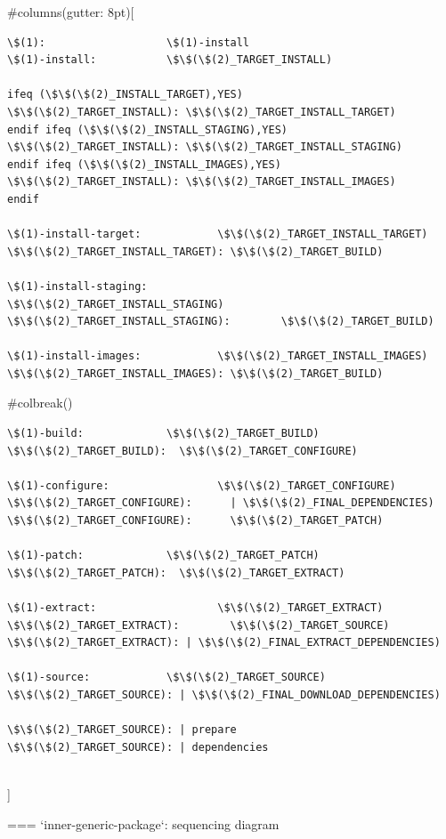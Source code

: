   
#columns(gutter: 8pt)[
\begin{block}{}
\begin{verbatim}
\$(1):                   \$(1)-install
\$(1)-install:           \$\$(\$(2)_TARGET_INSTALL)

ifeq (\$\$(\$(2)_INSTALL_TARGET),YES)
\$\$(\$(2)_TARGET_INSTALL): \$\$(\$(2)_TARGET_INSTALL_TARGET)
endif ifeq (\$\$(\$(2)_INSTALL_STAGING),YES)
\$\$(\$(2)_TARGET_INSTALL): \$\$(\$(2)_TARGET_INSTALL_STAGING)
endif ifeq (\$\$(\$(2)_INSTALL_IMAGES),YES)
\$\$(\$(2)_TARGET_INSTALL): \$\$(\$(2)_TARGET_INSTALL_IMAGES)
endif

\$(1)-install-target:            \$\$(\$(2)_TARGET_INSTALL_TARGET)
\$\$(\$(2)_TARGET_INSTALL_TARGET): \$\$(\$(2)_TARGET_BUILD)

\$(1)-install-staging:                   \$\$(\$(2)_TARGET_INSTALL_STAGING)
\$\$(\$(2)_TARGET_INSTALL_STAGING):        \$\$(\$(2)_TARGET_BUILD)

\$(1)-install-images:            \$\$(\$(2)_TARGET_INSTALL_IMAGES)
\$\$(\$(2)_TARGET_INSTALL_IMAGES): \$\$(\$(2)_TARGET_BUILD)
\end{verbatim}
\end{block}
     #colbreak()
\begin{block}{}
\begin{verbatim}
\$(1)-build:             \$\$(\$(2)_TARGET_BUILD)
\$\$(\$(2)_TARGET_BUILD):  \$\$(\$(2)_TARGET_CONFIGURE)

\$(1)-configure:                 \$\$(\$(2)_TARGET_CONFIGURE)
\$\$(\$(2)_TARGET_CONFIGURE):      | \$\$(\$(2)_FINAL_DEPENDENCIES)
\$\$(\$(2)_TARGET_CONFIGURE):      \$\$(\$(2)_TARGET_PATCH)

\$(1)-patch:             \$\$(\$(2)_TARGET_PATCH)
\$\$(\$(2)_TARGET_PATCH):  \$\$(\$(2)_TARGET_EXTRACT)

\$(1)-extract:                   \$\$(\$(2)_TARGET_EXTRACT)
\$\$(\$(2)_TARGET_EXTRACT):        \$\$(\$(2)_TARGET_SOURCE)
\$\$(\$(2)_TARGET_EXTRACT): | \$\$(\$(2)_FINAL_EXTRACT_DEPENDENCIES)

\$(1)-source:            \$\$(\$(2)_TARGET_SOURCE)
\$\$(\$(2)_TARGET_SOURCE): | \$\$(\$(2)_FINAL_DOWNLOAD_DEPENDENCIES)

\$\$(\$(2)_TARGET_SOURCE): | prepare
\$\$(\$(2)_TARGET_SOURCE): | dependencies
\end{verbatim}
\end{block}
  \\]


=== {`inner-generic-package`: sequencing diagram}

